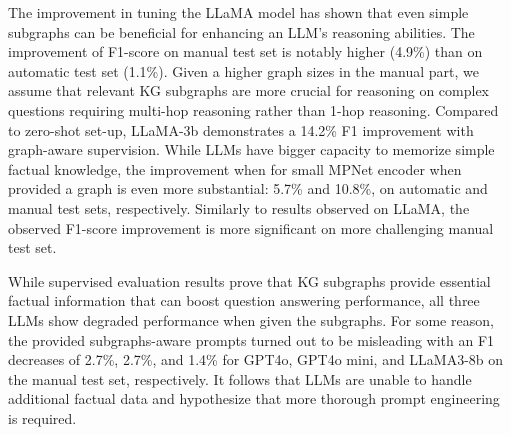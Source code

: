 The improvement in tuning the LLaMA model has shown that even simple subgraphs can be beneficial for enhancing an LLM's reasoning abilities. The improvement of F1-score on manual test set is notably higher (4.9\%) than on automatic test set (1.1\%). Given a higher graph sizes in the manual part, we assume that relevant KG subgraphs are more crucial for reasoning on complex questions requiring multi-hop reasoning rather than 1-hop reasoning. Compared to zero-shot set-up, LLaMA-3b demonstrates a 14.2\% F1 improvement with graph-aware supervision. While LLMs have bigger capacity to memorize simple factual knowledge, the improvement when for small MPNet encoder when provided a graph is even more substantial: 5.7\% and 10.8\%, on automatic and manual test sets, respectively. Similarly to results observed on LLaMA, the observed F1-score improvement is more significant on more challenging manual test set.

While supervised evaluation results prove that KG subgraphs provide essential factual information that can boost question answering performance, all three LLMs show degraded performance when given the subgraphs. For some reason, the provided subgraphs-aware prompts turned out to be misleading with an F1 decreases of 2.7\%, 2.7\%, and 1.4\% for GPT4o, GPT4o mini, and LLaMA3-8b on the manual test set, respectively. It follows that LLMs are unable to handle additional factual data and hypothesize that more thorough prompt engineering is required.
    
    
